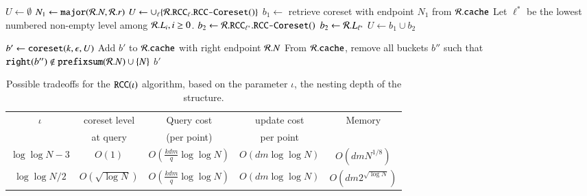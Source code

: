 \begin{algorithm}[t]
\DontPrintSemicolon
\caption{
$\mainds.\rcccoreset()$
\label{algo:rcc-getbuckets}
\label{algo:rcc-coreset}
}
$U \gets \emptyset$ \;
$N_1 \gets \texttt{major}(\mathcal{R}.N, \mathcal{R}.r)$ \;
{
	$U \gets \cup_{\ell} \{ \mathcal{R}.\texttt{RCC}_{\ell}.\texttt{RCC-Coreset}() \}$ \;
}
{
	$b_1 \gets$ retrieve coreset with endpoint $N_1$ from $\mathcal{R}.\texttt{cache}$\;
	Let $\ell^*$ be the lowest numbered non-empty level among $\mathcal{R}.L_i, i \ge 0$.\;
	{$b_2 \gets \mathcal{R}.\texttt{RCC}_{\ell^*}.\texttt{RCC-Coreset}()$}
	{$b_2 \gets \mathcal{R}.L_{\ell^*}$}
	$U \gets b_1 \cup b_2$ 
}

	$b' \gets \texttt{coreset}(k, \epsilon, U)$\;
	Add $b'$ to $\mathcal{R}.\texttt{cache}$ with right endpoint $\mathcal{R}.N$\;
	From $\mathcal{R}.\texttt{cache}$, remove all buckets $b''$ such that 
	${\tt right}(b'') \notin \texttt{prefixsum}(\mathcal{R}.N) \cup \{ N \}$ \;
\Return $b'$
\end{algorithm}

\begin{table}[ht]
{
\footnotesize
\setlength{\tabcolsep}{2pt}
\begin{tabular}{ c c c c c}
\toprule
$\iota$ & coreset level & Query cost  & update cost & Memory \\
        & at query      & (per point) & per point   & \\
\midrule
$\log \log N - 3$ & $O(1)$ & $O\left( \frac{kdm}{q} \log \log N \right)$ & $O(dm \log \log N)$ & $O\left( dmN^{1/8} \right)$ \\
\midrule
$\log \log N / 2$ & $O(\sqrt{\log N})$ & $O \left( \frac{kdm}{q} \log \log N \right)$ & $O(dm \log \log N)$ & $O \left( dm 2^{\sqrt{\log N}} \right)$ \\
\bottomrule
\end{tabular}
\smallskip
\caption{Possible tradeoffs for the $\texttt{RCC}(\iota)$ algorithm, based on the parameter $\iota$, the nesting depth of the structure.
\label{table:rcc}}
}
\end{table}

